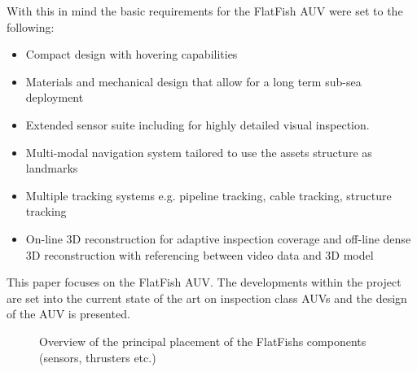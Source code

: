 \documentclass[conference]{IEEEtran}
\begin{document}
With this in mind the basic requirements for the FlatFish AUV were set to the following:

\begin{itemize}
    \item Compact design with hovering capabilities
    \item Materials and mechanical design that allow for a long term sub-sea deployment
    \item Extended sensor suite including for highly detailed visual inspection.
    \item Multi-modal navigation system tailored to use the assets structure as landmarks
    \item Multiple tracking systems e.g. pipeline tracking, cable tracking, structure
        tracking
    \item On-line 3D reconstruction for adaptive inspection coverage and off-line dense 3D
        reconstruction with referencing between video data and 3D model
\end{itemize}

This paper focuses on the FlatFish AUV. The developments within the project are set into
the current state of the art on inspection class AUVs and the design of the AUV is
presented.


\begin{figure}[!t]
	\begin{center}
		\centering
		\hfil
		\caption{Overview of the principal placement of the FlatFishs components (sensors, 
		thrusters etc.)}
		\label{fig:sensor_placement}
	\end{center}
\end{figure}
\end{document}

